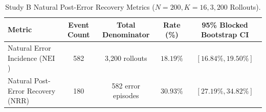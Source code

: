 \begin{table}[t]
\centering
\caption{Study B Natural Post-Error Recovery Metrics ($N=200, K=16, 3,200$ Rollouts).}
\label{tab:natural}
\begin{tabular}{lcccc}
\toprule
Metric & Event Count & Total Denominator & Rate (\%) & 95\% Blocked Bootstrap CI \\
\midrule
Natural Error Incidence ($\text{NEI}$) & 582 & 3,200 rollouts & $18.19\%$ & $[16.84\%, 19.50\%]$ \\
Natural Post-Error Recovery ($\text{NRR}$) & 180 & 582 error episodes & \textbf{$30.93\%$} & \textbf{$[27.19\%, 34.82\%]$} \\
\bottomrule
\end{tabular}
\end{table}

